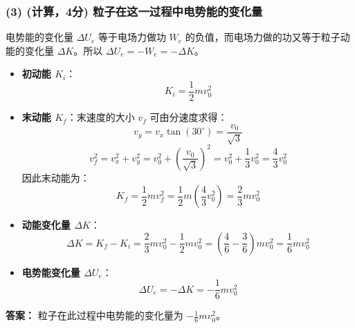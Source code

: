 \documentclass[12pt]{article}
\begin{document}
\subsubsection*{(3) (计算，4分) 粒子在这一过程中电势能的变化量}
电势能的变化量 $\Delta U_e$ 等于电场力做功 $W_e$ 的负值，而电场力做的功又等于粒子动能的变化量 $\Delta K$。所以 $\Delta U_e = -W_e = -\Delta K$。
\begin{itemize}
    \item \textbf{初动能 $K_i$}：
    \[ K_i = \frac{1}{2}mv_0^2 \]
    \item \textbf{末动能 $K_f$}：末速度的大小 $v_f$ 可由分速度求得：
    \[ v_y = v_x \tan(30^\circ) = \frac{v_0}{\sqrt{3}} \]
    \[ v_f^2 = v_x^2 + v_y^2 = v_0^2 + \left(\frac{v_0}{\sqrt{3}}\right)^2 = v_0^2 + \frac{1}{3}v_0^2 = \frac{4}{3}v_0^2 \]
    因此末动能为：
    \[ K_f = \frac{1}{2}mv_f^2 = \frac{1}{2}m\left(\frac{4}{3}v_0^2\right) = \frac{2}{3}mv_0^2 \]
    \item \textbf{动能变化量 $\Delta K$}：
    \[ \Delta K = K_f - K_i = \frac{2}{3}mv_0^2 - \frac{1}{2}mv_0^2 = \left(\frac{4}{6} - \frac{3}{6}\right)mv_0^2 = \frac{1}{6}mv_0^2 \]
    \item \textbf{电势能变化量 $\Delta U_e$}：
    \[ \Delta U_e = -\Delta K = -\frac{1}{6}mv_0^2 \]
\end{itemize}
\textbf{答案：} 粒子在此过程中电势能的变化量为 $\displaystyle -\frac{1}{6}mv_0^2$。
\end{document}

